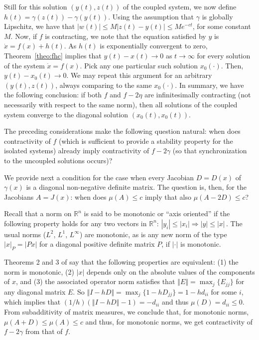 \documentclass{svmult}
\newcommand{\opteqn}[1]{$#1$}
\newcommand{\R}{{\mathbb R}}  %
\newcommand{\abs}[1]{\left\vert #1 \right\vert}
\newcommand{\norm}[1]{\left\Vert #1 \right\Vert}
\newcommand{\cc}{c}
\newcommand{\absv}[1]{\left\vert #1 \right\vert}
\begin{document}
Still for this solution $(y(t),z(t))$ of the coupled system,
we now define $h(t) = \gamma (z(t)) - \gamma (y(t))$.
Using the assumption that $\gamma $ is globally Lipschitz, we have that
$\abs{w(t)}\leq  M \abs{z(t)-y(t)} \leq M e^{-\cc t}$, for some constant $M$.
Now, if $f$ is contracting, we note that the equation
satisfied by $y$ is $\dot x=f(x)+h(t)$.
As $h(t)$ is exponentially convergent to zero, Theorem~\ref{theo:fhc}
implies that $y(t)-x(t)\rightarrow 0$ as $t\rightarrow \infty $ for every solution of the system
$\dot x=f(x)$.
Pick any one particular such solution $x_0(\cdot )$.
Then, $y(t)-x_0(t)\rightarrow 0$.
We may repeat this argument for an arbitrary $(y(t),z(t))$, always comparing
to the same $x_0(\cdot )$.
In summary, we have the following conclusion: if both $f$ and $f-2\eta $ are
infinitesimally contracting (not necessarily with respect to the same norm),
then all solutions of the coupled system converge to the diagonal solution
$(x_0(t),x_0(t))$.

The preceding considerations make the following question natural: when
does contractivity of $f$ (which is sufficient to provide a stability property
for the isolated  systems) already imply contractivity of $f-2\gamma $ (so that
synchronization to the uncoupled solutions occurs)?

We provide next a condition for the case when every Jacobian $D=D(x)$
of $\gamma (x)$ is a diagonal non-negative definite matrix.
The question is, then, for the Jacobians $A=J(x)$: when does
$\mu (A)\leq c$ imply that also $\mu (A-2D)\leq c$?

Recall that a norm on $\R^n$ is said to be monotonic or ``axis oriented''
if the following property holds for any two vectors in $\R^n$:
\opteqn{
\abs{y_i} \leq  \abs{x_i}   \Rightarrow  \abs{y} \leq \abs{x}\,.
}
The usual norms ($L^2$, $L^1$, $L^\infty $) are monotonic, as is any new norm
of the type $\abs{x}_P = \abs{Px}$ for a diagonal positive definite matrix $P$,
if $\abs{\cdot }$ is monotonic.

Theorems 2 and 3 of \cite{bauer} say that the following properties are
equivalent: (1) the norm is monotonic, (2) $\absv{x}$ depends only on the
absolute values of the components of $x$, and (3) the associated operator norm
satisfies that $\norm{E} = \max_j\{E_{jj}\}$ for any diagonal matrix $E$.
So $\norm{I-hD} = \max_j\{1-hD_{jj}\} = 1-hd_{ii}$ for some $i$,
which implies that $(1/h)(\norm{I-hD}-1) = -d_{ii}$ and thus
$\mu (D) = d_{ii}\leq 0$.
From subadditivity of matrix measures, we conclude that, for monotonic norms,
\opteqn{
\mu (A+D) \leq  \mu (A) \leq  c
}
and thus, for monotonic norms, we get contractivity of $f-2\gamma $ from
that of $f$.
\end{document}
